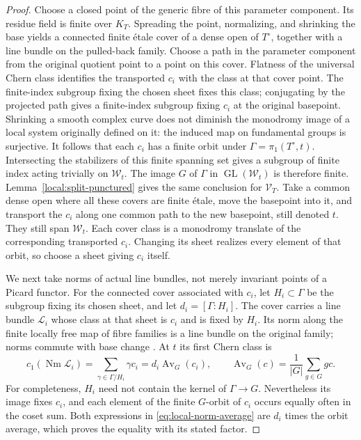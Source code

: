\begin{proof}
Choose a closed point of the generic fibre of this parameter
component.  Its residue field is finite over $K_T$.  Spreading the
point, normalizing, and shrinking the base yields a connected finite
\'etale cover of a dense open of $T^\circ$, together
with a line bundle on the pulled-back family. Choose a path in the
parameter component from the original quotient point to a point
on this cover. Flatness of the universal Chern class identifies
the transported $c_i$ with the class at that cover point. The
finite-index subgroup fixing the chosen sheet fixes this class;
conjugating by the projected path gives a finite-index subgroup
fixing $c_i$ at the original basepoint. Shrinking a smooth complex curve does
not diminish the monodromy image of a local system originally
defined on it: the induced map on fundamental groups is surjective.
It follows that each $c_i$ has a finite orbit under
$\Gamma=\pi_1(T^\circ,t)$.  Intersecting the stabilizers of this
finite spanning set gives a subgroup of finite index acting trivially
on $\mathcal W_t$.  The image $G$ of $\Gamma$ in
$\operatorname{GL}(\mathcal W_t)$ is therefore finite.
Lemma~\ref{local:split-punctured} gives the same conclusion for
$\mathcal V_T$.
Take a common dense open where all these covers are finite
\'etale, move the basepoint into it, and transport
the $c_i$ along one common path to the new basepoint, still denoted
$t$.  They still span $\mathcal W_t$.  Each cover class is a
monodromy translate of the corresponding transported $c_i$.
Changing its sheet realizes every element of that orbit, so choose
a sheet giving $c_i$ itself.

We next take norms of actual line bundles, not merely invariant
points of a Picard functor.  For the connected cover associated with
$c_i$, let $H_i\subset\Gamma$ be the subgroup fixing its chosen
sheet, and let $d_i=[\Gamma:H_i]$.  The cover carries a line bundle
$\mathcal L_i$ whose class at that sheet is $c_i$ and is fixed by $H_i$.  Its norm
along the finite locally free map of fibre families is a line bundle
on the original family; norms commute with base change
\cite[Tags~0BCY and~0BD2]{Stacks}.  At $t$ its first Chern class is
\begin{equation}\label{eq:local-norm-average}
 c_1(\operatorname{Nm}\mathcal L_i)
   =\sum_{\gamma\in\Gamma/H_i}\gamma c_i
   =d_i\operatorname{Av}_G(c_i),
 \qquad
 \operatorname{Av}_G(c)=\frac1{|G|}\sum_{g\in G}gc.
\end{equation}
For completeness, $H_i$ need not contain the kernel of
$\Gamma\to G$.  Nevertheless its image fixes $c_i$, and each element
of the finite $G$-orbit of $c_i$ occurs equally often in the coset
sum.  Both expressions in \eqref{eq:local-norm-average} are
$d_i$ times the orbit average, which proves the equality with its
stated factor.


\end{proof}
